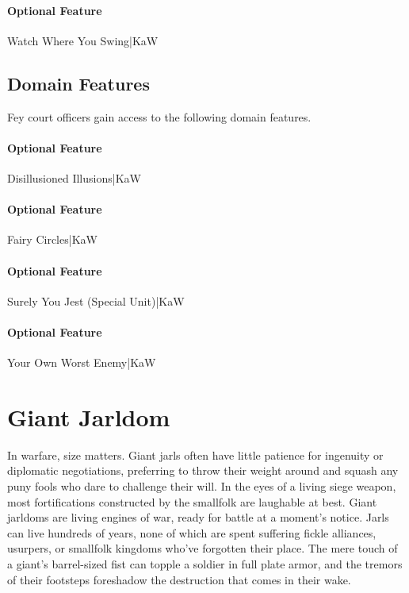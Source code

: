 \documentclass[10pt,a4paper,twoside,bg=print,twocolumn,openany,nodeprecatedcode]{dndbook}
\begin{document}
\paragraph{Optional Feature}
Watch Where You Swing|KaW

\subsection{Domain Features}
Fey court officers gain access to the following domain features.

\paragraph{Optional Feature}
Disillusioned Illusions|KaW

\paragraph{Optional Feature}
Fairy Circles|KaW

\paragraph{Optional Feature}
Surely You Jest (Special Unit)|KaW

\paragraph{Optional Feature}
Your Own Worst Enemy|KaW

\section{Giant Jarldom}
In warfare, size matters. Giant jarls often have little patience for ingenuity or diplomatic negotiations, preferring to throw their weight around and squash any puny fools who dare to challenge their will. In the eyes of a living siege weapon, most fortifications constructed by the smallfolk are laughable at best. Giant jarldoms are living engines of war, ready for battle at a moment's notice. Jarls can live hundreds of years, none of which are spent suffering fickle alliances, usurpers, or smallfolk kingdoms who've forgotten their place. The mere touch of a giant's barrel-sized fist can topple a soldier in full plate armor, and the tremors of their footsteps foreshadow the destruction that comes in their wake.
\end{document}
